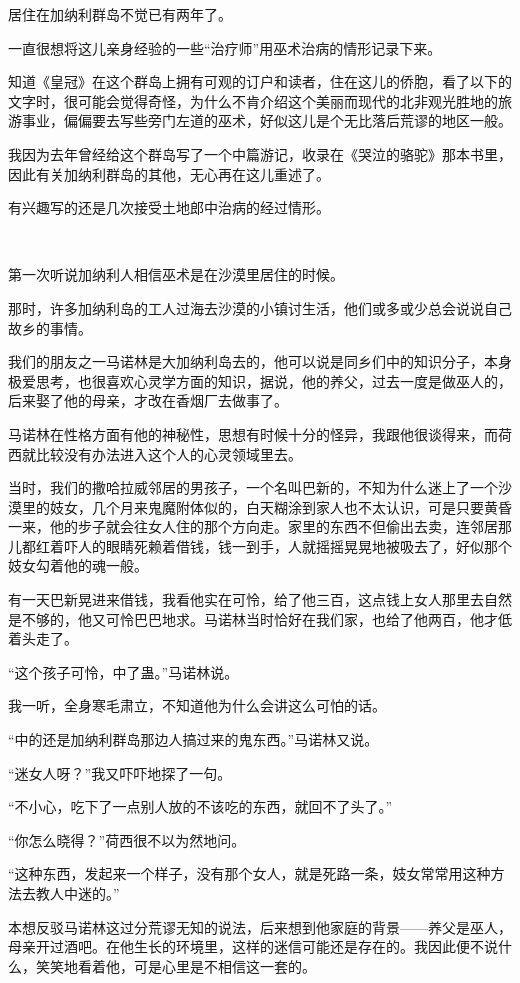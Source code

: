 \par 居住在加纳利群岛不觉已有两年了。
\par 一直很想将这儿亲身经验的一些“治疗师”用巫术治病的情形记录下来。
\par 知道《皇冠》在这个群岛上拥有可观的订户和读者，住在这儿的侨胞，看了以下的文字时，很可能会觉得奇怪，为什么不肯介绍这个美丽而现代的北非观光胜地的旅游事业，偏偏要去写些旁门左道的巫术，好似这儿是个无比落后荒谬的地区一般。
\par 我因为去年曾经给这个群岛写了一个中篇游记，收录在《哭泣的骆驼》那本书里，因此有关加纳利群岛的其他，无心再在这儿重述了。
\par 有兴趣写的还是几次接受土地郎中治病的经过情形。
\par  
\par 第一次听说加纳利人相信巫术是在沙漠里居住的时候。
\par 那时，许多加纳利岛的工人过海去沙漠的小镇讨生活，他们或多或少总会说说自己故乡的事情。
\par 我们的朋友之一马诺林是大加纳利岛去的，他可以说是同乡们中的知识分子，本身极爱思考，也很喜欢心灵学方面的知识，据说，他的养父，过去一度是做巫人的，后来娶了他的母亲，才改在香烟厂去做事了。
\par 马诺林在性格方面有他的神秘性，思想有时候十分的怪异，我跟他很谈得来，而荷西就比较没有办法进入这个人的心灵领域里去。
\par 当时，我们的撒哈拉威邻居的男孩子，一个名叫巴新的，不知为什么迷上了一个沙漠里的妓女，几个月来鬼魔附体似的，白天糊涂到家人也不太认识，可是只要黄昏一来，他的步子就会往女人住的那个方向走。家里的东西不但偷出去卖，连邻居那儿都红着吓人的眼睛死赖着借钱，钱一到手，人就摇摇晃晃地被吸去了，好似那个妓女勾着他的魂一般。
\par 有一天巴新晃进来借钱，我看他实在可怜，给了他三百，这点钱上女人那里去自然是不够的，他又可怜巴巴地求。马诺林当时恰好在我们家，也给了他两百，他才低着头走了。
\par “这个孩子可怜，中了蛊。”马诺林说。
\par 我一听，全身寒毛肃立，不知道他为什么会讲这么可怕的话。
\par “中的还是加纳利群岛那边人搞过来的鬼东西。”马诺林又说。
\par “迷女人呀？”我又吓吓地探了一句。
\par “不小心，吃下了一点别人放的不该吃的东西，就回不了头了。”
\par “你怎么晓得？”荷西很不以为然地问。
\par “这种东西，发起来一个样子，没有那个女人，就是死路一条，妓女常常用这种方法去教人中迷的。”
\par 本想反驳马诺林这过分荒谬无知的说法，后来想到他家庭的背景——养父是巫人，母亲开过酒吧。在他生长的环境里，这样的迷信可能还是存在的。我因此便不说什么，笑笑地看着他，可是心里是不相信这一套的。
